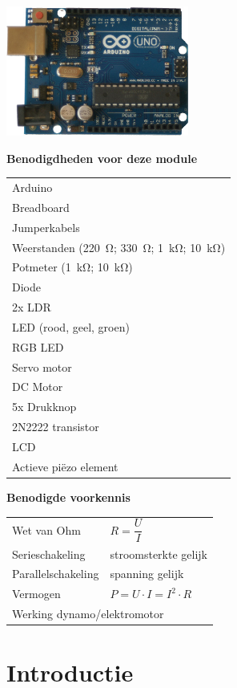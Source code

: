 \documentclass{arduino}
\begin{document}
\includegraphics[width=6cm]{1. Arduino}

\textbf{Benodigdheden voor deze module}

\begin{tabular}{l}
Arduino \\
Breadboard \\
Jumperkabels \\
Weerstanden (\SI{220}{\ohm}; \SI{330}{\ohm}; \SI{1}{\kilo\ohm}; \SI{10}{\kilo\ohm}) \\
Potmeter (\SI{1}{\kilo\ohm}; \SI{10}{\kilo\ohm}) \\
Diode \\
2x LDR \\
LED (rood, geel, groen) \\
RGB LED \\
Servo motor \\
DC Motor \\
5x Drukknop \\
2N2222 transistor \\
LCD \\
Actieve piëzo element \\
\end{tabular}

\textbf{Benodigde voorkennis}

\begin{tabular}{ll}
Wet van Ohm & $R = \dfrac{U}{I}$\\
Serieschakeling & stroomsterkte gelijk \\
Parallelschakeling & spanning gelijk \\
Vermogen & $P = U \cdot I = I^2 \cdot R$ \\
\multicolumn{2}{l}{Werking dynamo/elektromotor}\\
\end{tabular}

\newpage

\section{Introductie}
\end{document}
